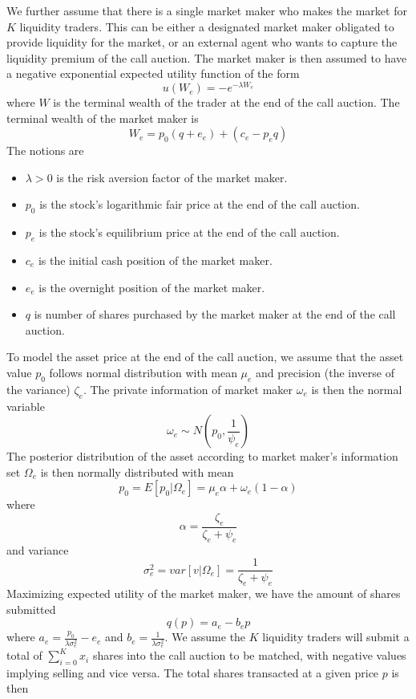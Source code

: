 \documentclass{article}
\begin{document}
We further assume that there is a single market maker who makes the market for $K$ liquidity traders. This can be either a designated market maker obligated to provide liquidity for the market, or an external agent who wants to capture the liquidity premium of the call auction. The market maker is then assumed to have a negative exponential expected utility function of the form
\[
  u(W_e) = -e^{-\lambda W_e}
\]
where $W$ is the terminal wealth of the trader at the end of the call auction. The terminal wealth of the market maker is
\[
  W_e = p_0 (q + e_e) + (c_e - p_e q)
\]
The notions are
\begin{itemize}
  \item $\lambda>0$ is the risk aversion factor of the market maker.
  \item $p_0$ is the stock's logarithmic fair price at the end of the call auction.
  \item $p_e$ is the stock's equilibrium price at the end of the call auction.
  \item $c_e$ is the initial cash position of the market maker.
  \item $e_e$ is the overnight position of the market maker.
  \item $q$ is number of shares purchased by the market maker at the end of the call auction.
\end{itemize}
To model the asset price at the end of the call auction, we assume that the asset value $p_0$ follows normal distribution with mean $\mu_e$ and precision (the inverse of the variance) $\zeta_e$. The private information of market maker $\omega_e$ is then the normal variable
\[
  \omega_e \sim N(p_0, \frac{1}{\psi_e})
\]
The posterior distribution of the asset according to market maker's information set $\Omega_e$ is then normally distributed with mean
\[
  p_0=E[p_0|\Omega_e]=\mu_e \alpha + \omega_e(1 - \alpha)
\]
where
\[
  \alpha = \frac{\zeta_e}{\zeta_e+\psi_e}
\]
and variance
\[
  \sigma_e^2=var[v|\Omega_e]=\frac{1}{\zeta_e+\psi_e}
\]
Maximizing expected utility of the market maker, we have the amount of shares submitted
\begin{equation}\label{eqn:mm_eval_eqb}
  q(p) = a_e - b_e p
\end{equation}
where $a_e = \frac{p_0}{\lambda \sigma_e^2} - e_e$ and $b_e=\frac{1}{\lambda \sigma_e^2}$. We assume the $K$ liquidity traders will submit a total of $\sum_{i=0}^K x_i$ shares into the call auction to be matched, with negative values implying selling and vice versa. The total shares transacted at a given price $p$ is then
\end{document}
